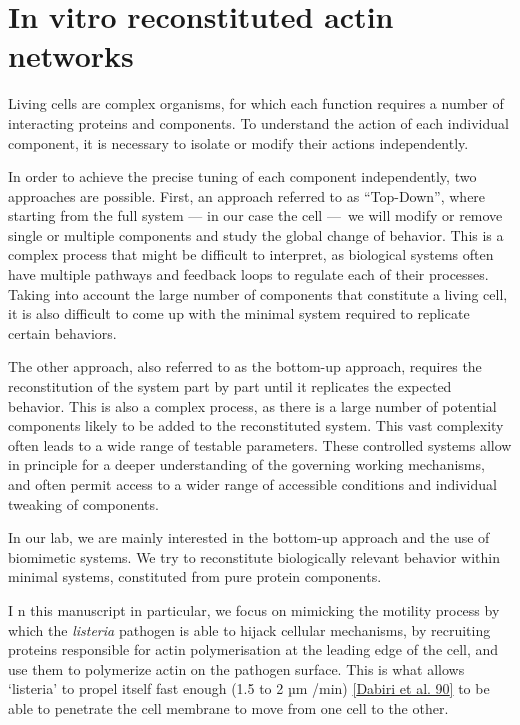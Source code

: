 \documentclass[A4paperpaper,11pt,english]{sphinxmanual}
\begin{document}
\section{In vitro reconstituted actin networks}
\label{index-latex:in-vitro-reconstituted-actin-networks}
Living cells are complex organisms, for which each function requires a number
of interacting proteins and components. To understand the action of each
individual component, it is necessary to isolate or modify their actions
independently.

In order to achieve the precise tuning of each component independently, two
approaches are possible. First, an approach referred to  as ``Top-Down'', where
starting from the full system — in our case the cell — we will modify or remove
single or multiple components and study the global change of behavior. This is a complex
process that might be difficult to interpret, as biological systems often have
multiple pathways and feedback loops to regulate each of their processes. Taking into account the
large number of components that constitute a living cell, it is also
difficult to come up with the minimal system required to replicate certain behaviors.

The other approach, also referred to as the bottom-up approach, requires
the reconstitution of the system part by part until it replicates the expected
behavior. This is also a complex process, as there is a large number of potential components
likely to be added to the reconstituted system. This vast complexity
often leads to a wide range of testable parameters.
These controlled systems allow in principle for a deeper understanding of the governing
working mechanisms, and often permit access to a wider range of accessible
conditions and individual tweaking of components.

In our lab, we are mainly interested in the bottom-up approach and the use of
biomimetic systems. We try to reconstitute biologically relevant behavior within
minimal systems,  constituted from pure protein components.

I       n this manuscript in particular, we focus on mimicking the motility process
by which the \emph{listeria} pathogen is able to hijack cellular mechanisms, by recruiting proteins
responsible for actin polymerisation at the leading edge of the cell, and use
them to polymerize actin on the pathogen surface. This is what allows `listeria' to
propel itself fast enough (1.5 to 2 µm /min) {\hyperref[index-latex:dabiri1990]{{[}Dabiri et al. 90{]}}} to be able to
penetrate the cell membrane to move from one cell to the other.
\end{document}
